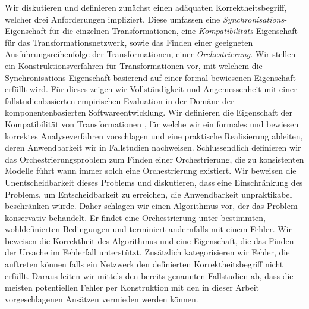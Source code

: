 Wir diskutieren und definieren zunächst einen adäquaten Korrektheitsbegriff, welcher drei Anforderungen impliziert. Diese umfassen eine \emph{Synchronisations}-Eigenschaft für die einzelnen Transformationen, eine \emph{Kompatibilitäts}-Eigenschaft für das Transformationsnetzwerk, sowie das Finden einer geeigneten Ausführungsreihenfolge der Transformationen, einer \emph{Orchestrierung}.
Wir stellen ein Konstruktionsverfahren für Transformationen vor, mit welchem die Synchronisations-Eigenschaft basierend auf einer formal bewiesenen Eigenschaft erfüllt wird.
Für dieses zeigen wir Vollständigkeit und Angemessenheit mit einer fallstudienbasierten empirischen Evaluation in der Domäne der komponentenbasierten Softwareentwicklung.
Wir definieren die Eigenschaft der Kompatibilität von Transformationen%
, für welche wir ein formales und bewiesen korrektes Analyseverfahren vorschlagen und eine praktische Realisierung ableiten, deren Anwendbarkeit wir in Fallstudien nachweisen.
Schlussendlich definieren wir das Orchestrierungsproblem zum Finden einer Orchestrierung, die zu konsistenten Modelle führt wann immer solch eine Orchestrierung existiert. %
Wir beweisen die Unentscheidbarkeit dieses Problems und diskutieren, dass eine Einschränkung des Problems, um Entscheidbarkeit zu erreichen, die Anwendbarkeit unpraktikabel beschränken würde.
Daher schlagen wir einen Algorithmus vor, der das Problem konservativ behandelt.
Er findet eine Orchestrierung unter bestimmten, wohldefinierten Bedingungen und terminiert andernfalls mit einem Fehler.
Wir beweisen die Korrektheit des Algorithmus und eine Eigenschaft, die das Finden der Ursache im Fehlerfall unterstützt.
Zusätzlich kategorisieren wir Fehler, die auftreten können falls ein Netzwerk den definierten Korrektheitsbegriff nicht erfüllt.
Daraus leiten wir mittels den bereits genannten Fallstudien ab, dass die meisten potentiellen Fehler per Konstruktion mit den in dieser Arbeit vorgeschlagenen Ansätzen vermieden werden können.

